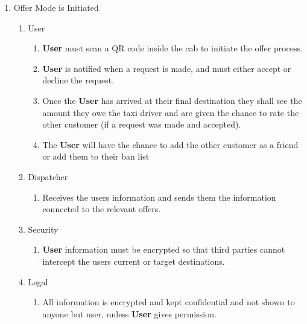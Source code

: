 \documentclass[english]{article}
\begin{document}
\begin{enumerate}[{BE}1.]
	\item Offer	Mode is Initiated	
	\begin{enumerate}[{VP5}.1]
		\item User
			\begin{enumerate}
				\item \textbf{User} must scan a QR code inside the cab to initiate the offer process.
				\item \textbf{User} is notified when a request is made, and must either accept or decline the request.
				\item Once the \textbf{User} has arrived at their final destination they shall see the amount they owe the taxi driver and are given the chance to rate the other customer (if a request was made and accepted).
				\item The \textbf{User} will have the chance to add the other customer as a friend or add them to their ban list
			\end{enumerate}
		\item Dispatcher
			\begin{enumerate}
				\item Receives the users information and sends them the information connected to the relevant offers.
			\end{enumerate}
		\item Security
			\begin{enumerate}
				\item \textbf{User} information must be encrypted so that third parties cannot intercept the users current or target destinations.
			\end{enumerate}
		\item Legal
			\begin{enumerate}
				\item All information is encrypted and kept confidential and not shown to anyone but user, unless \textbf{User} gives permission.
			\end{enumerate}
	\end{enumerate}


\end{enumerate}
\end{document}
